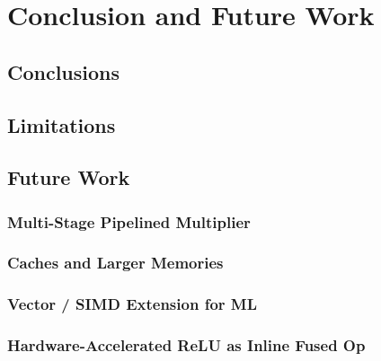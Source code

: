 \chapter{Conclusion and Future Work}
\label{ch:conclusion}

\section{Conclusions}

\section{Limitations}

\section{Future Work}
\subsection{Multi-Stage Pipelined Multiplier}
\subsection{Caches and Larger Memories}
\subsection{Vector / SIMD Extension for ML}
\subsection{Hardware-Accelerated ReLU as Inline Fused Op}

